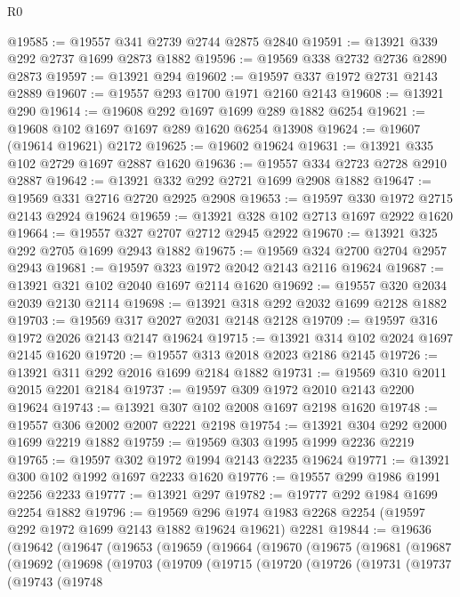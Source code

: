 \begin{lexlean}{R0}
\begin{coremodule}
@19585 := @19557 @341 @2739 @2744 @2875 @2840
@19591 := @13921 @339 @292 @2737 @1699 @2873 @1882
@19596 := @19569 @338 @2732 @2736 @2890 @2873
@19597 := @13921 @294
@19602 := @19597 @337 @1972 @2731 @2143 @2889
@19607 := @19557 @293 @1700 @1971 @2160 @2143
@19608 := @13921 @290
@19614 := @19608 @292 @1697 @1699 @289 @1882 @6254
@19621 := @19608 @102 @1697 @1697 @289 @1620 @6254 @13908
@19624 := @19607 (@19614 @19621) @2172
@19625 := @19602 @19624
@19631 := @13921 @335 @102 @2729 @1697 @2887 @1620
@19636 := @19557 @334 @2723 @2728 @2910 @2887
@19642 := @13921 @332 @292 @2721 @1699 @2908 @1882
@19647 := @19569 @331 @2716 @2720 @2925 @2908
@19653 := @19597 @330 @1972 @2715 @2143 @2924 @19624
@19659 := @13921 @328 @102 @2713 @1697 @2922 @1620
@19664 := @19557 @327 @2707 @2712 @2945 @2922
@19670 := @13921 @325 @292 @2705 @1699 @2943 @1882
@19675 := @19569 @324 @2700 @2704 @2957 @2943
@19681 := @19597 @323 @1972 @2042 @2143 @2116 @19624
@19687 := @13921 @321 @102 @2040 @1697 @2114 @1620
@19692 := @19557 @320 @2034 @2039 @2130 @2114
@19698 := @13921 @318 @292 @2032 @1699 @2128 @1882
@19703 := @19569 @317 @2027 @2031 @2148 @2128
@19709 := @19597 @316 @1972 @2026 @2143 @2147 @19624
@19715 := @13921 @314 @102 @2024 @1697 @2145 @1620
@19720 := @19557 @313 @2018 @2023 @2186 @2145
@19726 := @13921 @311 @292 @2016 @1699 @2184 @1882
@19731 := @19569 @310 @2011 @2015 @2201 @2184
@19737 := @19597 @309 @1972 @2010 @2143 @2200 @19624
@19743 := @13921 @307 @102 @2008 @1697 @2198 @1620
@19748 := @19557 @306 @2002 @2007 @2221 @2198
@19754 := @13921 @304 @292 @2000 @1699 @2219 @1882
@19759 := @19569 @303 @1995 @1999 @2236 @2219
@19765 := @19597 @302 @1972 @1994 @2143 @2235 @19624
@19771 := @13921 @300 @102 @1992 @1697 @2233 @1620
@19776 := @19557 @299 @1986 @1991 @2256 @2233
@19777 := @13921 @297
@19782 := @19777 @292 @1984 @1699 @2254 @1882
@19796 := @19569
    @296
    @1974
    @1983
    @2268
    @2254
    (@19597 @292 @1972 @1699 @2143 @1882 @19624 @19621)
    @2281
@19844 := @19636
    (@19642
      (@19647
        (@19653
          (@19659
            (@19664
              (@19670
                (@19675
                  (@19681
                    (@19687
                      (@19692
                        (@19698
                          (@19703
                            (@19709
                              (@19715
                                (@19720
                                  (@19726
                                    (@19731
                                      (@19737
                                        (@19743
                                          (@19748

\end{coremodule}
\end{lexlean}
